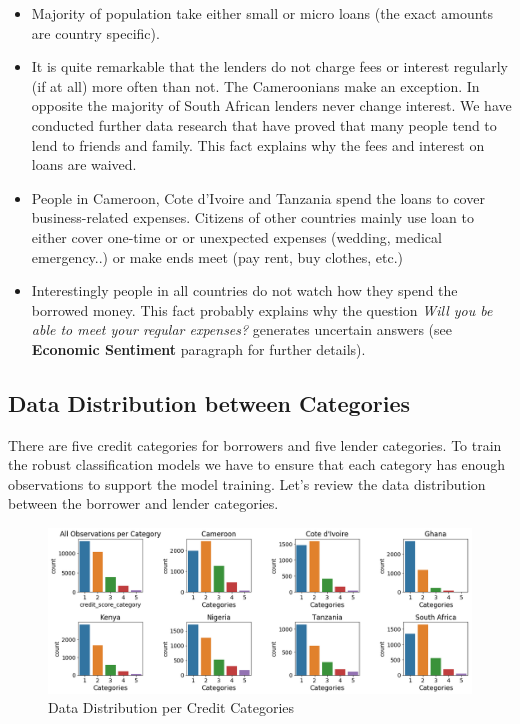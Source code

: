 \begin{itemize}
\tightlist
\item
  Majority of population take either small or micro loans (the exact
  amounts are country specific).
\item
  It is quite remarkable that the lenders do not charge fees or interest
  regularly (if at all) more often than not. The Cameroonians make an
  exception. In opposite the majority of South African lenders never
  change interest. We have conducted further data research that have
  proved that many people tend to lend to friends and family. This fact
  explains why the fees and interest on loans are waived.
\item
  People in Cameroon, Cote d'Ivoire and Tanzania spend the loans to
  cover business-related expenses. Citizens of other countries mainly
  use loan to either cover one-time or or unexpected expenses (wedding,
  medical emergency..) or make ends meet (pay rent, buy clothes, etc.)
\item
  Interestingly people in all countries do not watch how they spend the
  borrowed money. This fact probably explains why the question
  \emph{Will you be able to meet your regular expenses?} generates
  uncertain answers (see \textbf{Economic Sentiment} paragraph for
  further details).
\end{itemize}

\hypertarget{data-distribution-between-categories}{%
\subsection{Data Distribution between
Categories}\label{data-distribution-between-categories}}

There are five credit categories for borrowers and five lender
categories. To train the robust classification models we have to ensure
that each category has enough observations to support the model
training. Let's review the data distribution between the borrower and
lender categories.

\begin{Schunk}
\begin{figure}[H]

{\centering \includegraphics[width=1.15\linewidth]{../../artifacts/bcategories} 

}

\caption[Data Distribution per Credit Categories]{Data Distribution per Credit Categories}\label{fig:dc}
\end{figure}
\end{Schunk}

